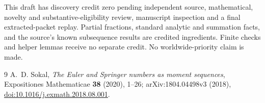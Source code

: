 \documentclass[11pt]{article}
\begin{document}
This draft has discovery credit zero pending independent source, mathematical, novelty and substantive-eligibility review, manuscript inspection and a final extracted-packet replay. Partial fractions, standard analytic and summation facts, and the source's known subsequence results are credited ingredients. Finite checks and helper lemmas receive no separate credit. No worldwide-priority claim is made.

\begin{thebibliography}{9}
 A.~D. Sokal, \emph{The Euler and Springer numbers as moment sequences}, Expositiones Mathematicae \textbf{38} (2020), 1--26; arXiv:1804.04498v3 (2018), \href{https://doi.org/10.1016/j.exmath.2018.08.001}{doi:10.1016/j.exmath.2018.08.001}.
\end{thebibliography}
\end{document}
